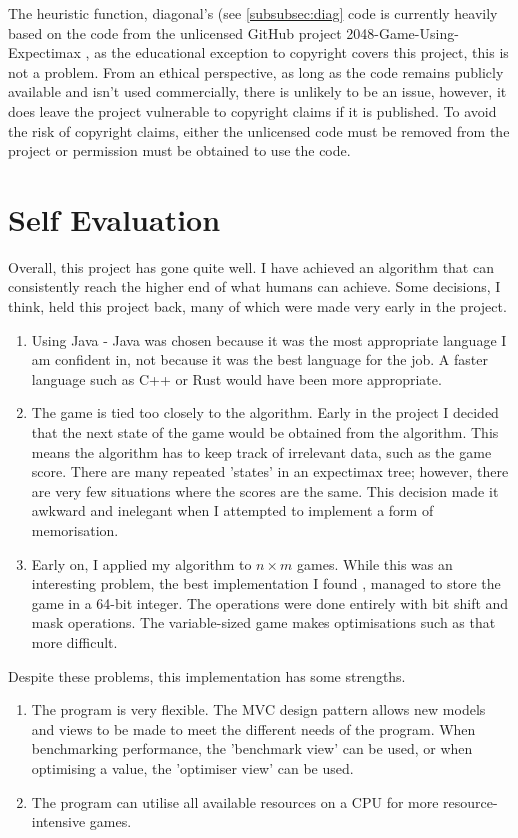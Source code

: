 \documentclass{article}
\begin{document}
The heuristic function, diagonal's (see \ref{subsubsec:diag} code is currently heavily based on the code from the unlicensed GitHub project 2048-Game-Using-Expectimax \cite{expectimax2048}, as the educational exception to copyright covers this project, this is not a problem. From an ethical perspective, as long as the code remains publicly available and isn't used commercially, there is unlikely to be an issue, however, it does leave the project vulnerable to copyright claims if it is published. To avoid the risk of copyright claims, either the unlicensed code must be removed from the project or permission must be obtained to use the code.
\section{Self Evaluation}
Overall, this project has gone quite well. I have achieved an algorithm that can consistently reach the higher end of what humans can achieve. Some decisions, I think, held this project back, many of which were made very early in the project.
\begin{enumerate}
    \item Using Java - Java was chosen because it was the most appropriate language I am confident in, not because it was the best language for the job. A faster language such as C++ or Rust would have been more appropriate.
    \item The game is tied too closely to the algorithm. Early in the project I decided that the next state of the game would be obtained from the algorithm. This means the algorithm has to keep track of irrelevant data, such as the game score. There are many repeated 'states' in an expectimax tree; however, there are very few situations where the scores are the same. This decision made it awkward and inelegant when I attempted to implement a form of memorisation.
    \item Early on, I applied my algorithm to $n \times m$ games. While this was an interesting problem, the best implementation I found \cite{_16k2048ai}, managed to store the game in a 64-bit integer. The operations were done entirely with bit shift and mask operations. The variable-sized game makes optimisations such as that more difficult.
\end{enumerate}
Despite these problems, this implementation has some strengths.
\begin{enumerate}
    \item The program is very flexible. The MVC design pattern allows new models and views to be made to meet the different needs of the program. When benchmarking performance, the 'benchmark view' can be used, or when optimising a value, the 'optimiser view' can be used.
    \item The program can utilise all available resources on a CPU for more resource-intensive games.
\end{enumerate}
\newpage
\appendix
\end{document}
